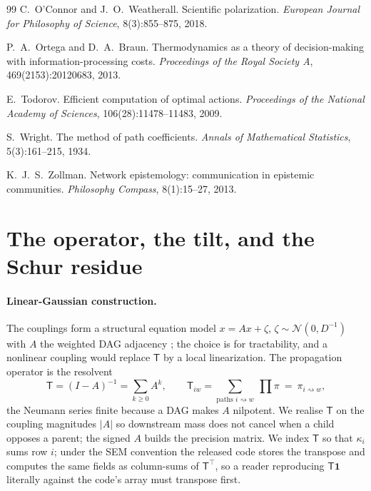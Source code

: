 \documentclass[runningheads]{llncs}
\newcommand{\rw}{\rightsquigarrow}
\newcommand{\Top}{\mathsf{T}}          %
\newcommand{\bone}{\mathbf{1}}         %
\begin{document}
\begin{thebibliography}{99}
C.~O'Connor and J.~O.~Weatherall.
Scientific polarization. \emph{European Journal for Philosophy of Science}, 8(3):855--875, 2018.

P.~A.~Ortega and D.~A.~Braun.
Thermodynamics as a theory of decision-making with information-processing costs.
\emph{Proceedings of the Royal Society A}, 469(2153):20120683, 2013.

E.~Todorov.
Efficient computation of optimal actions.
\emph{Proceedings of the National Academy of Sciences}, 106(28):11478--11483, 2009.

S.~Wright.
The method of path coefficients. \emph{Annals of Mathematical Statistics}, 5(3):161--215, 1934.

K.~J.~S.~Zollman.
Network epistemology: communication in epistemic communities.
\emph{Philosophy Compass}, 8(1):15--27, 2013.

\end{thebibliography}

\clearpage
\appendix
\section{The operator, the tilt, and the Schur residue}
\label{app:operator}

\paragraph{Linear-Gaussian construction.} The couplings form a structural equation model $x=Ax+\zeta$,
$\zeta\sim\mathcal N(0,D^{-1})$ with $A$ the weighted DAG adjacency \citep{koller2009}; the choice is
for tractability, and a nonlinear coupling would replace $\Top$ by a local linearization. The
propagation operator is the resolvent
\begin{equation}
\Top=(I-A)^{-1}=\sum_{k\ge 0}A^k,\qquad
\Top_{iw}=\!\!\sum_{\text{paths }i\rw w}\ \prod \pi\ =\ \pi_{i\rw w},
\label{eq:Top-full}
\end{equation}
the Neumann series finite because a DAG makes $A$ nilpotent. We realise $\Top$ on the coupling
magnitudes $|A|$ so downstream mass does not cancel when a child opposes a parent; the signed $A$
builds the precision matrix. We index $\Top$ so that $\kappa_i$ sums row $i$; under the SEM
convention the released code stores the transpose and computes the same fields as column-sums of
$\Top^{\!\top}$, so a reader reproducing $\Top\bone$ literally against the code's array must
transpose first.
\end{document}
